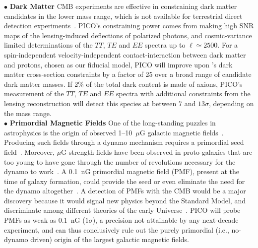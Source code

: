 \documentclass[PICOAPC.tex]{subfiles}
\begin{document}
\noindent$\bullet$ {\bf Dark Matter} \hspace{0.1in} \ac{CMB} experiments are effective in constraining dark matter candidates in the lower mass range, which is not available for terrestrial direct detection experiments~\citep{Slatyer2009,Galli2009,Huetsi2009,Huetsi2011,Madhavacheril:2013cna,Green:2018pmd}. 
PICO's constraining power comes from making high \ac{SNR} maps of the lensing-induced deflections of polarized photons, and cosmic-variance limited determinations of the $TT$, $TE$ and $EE$ spectra up to $\ell \simeq 2500$. 
For a spin-independent velocity-independent contact-interaction between dark matter and protons, chosen as our fiducial model, PICO will improve upon \planck 's dark matter cross-section constraints by a factor of 25 over a broad range of candidate dark matter masses. 
If 2\% of the total dark content is made of axions, PICO's measurement of the $TT$, $TE$ and $EE$ spectra with additional constraints from the lensing reconstruction will detect this species at between $7$ and $13\sigma$, depending on the mass range.   \\
$\bullet$ {\bf Primordial Magnetic Fields} \hspace{0.1in} One of the long-standing puzzles in astrophysics is the origin of observed 1--10~$\mu$G galactic magnetic fields~\citep{Widrow:2002ud}. Producing such fields through a dynamo mechanism requires a primordial seed field~\citep{Widrow:2011hs}. Moreover, $\mu$G-strength fields have been observed in proto-galaxies that are too young to have gone through the number of revolutions necessary for the dynamo to work~\citep{Athreya:1998}. A 0.1~nG primordial magnetic field (PMF), present at the time of galaxy formation, could provide the seed or even eliminate the need for the dynamo altogether~\citep{Grasso:2000wj}. 
A detection of PMFs with the CMB would be a major discovery because it would signal new physics beyond the Standard Model, and discriminate among different theories of the early Universe~\cite{Barnaby:2012tk,Long:2013tha,Durrer:2013pga}. PICO will probe PMFs as weak as 0.1~nG ($1\sigma$), a precision not attainable by any next-decade experiment, and can thus conclusively rule out the purely primordial (i.e., no-dynamo driven) origin of the largest galactic magnetic fields. \\
\end{document}
